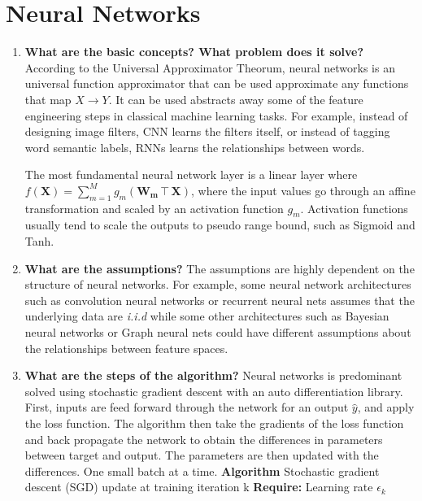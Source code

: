 \documentclass{article}
\begin{document}
\section{Neural Networks}
\noindent
\begin{enumerate}
    \item \textbf{What are the basic concepts? What problem does it solve?}
    \noindent 
    \smallbreak
    According to the Universal Approximator Theorum, neural networks is an universal function approximator that can be used approximate any functions that map $X \rightarrow Y$. It can be used abstracts away some of the feature engineering steps in classical machine learning tasks. For example, instead of designing image filters, CNN learns the filters itself, or instead of tagging word semantic labels, RNNs learns the relationships between words.
    
    The most fundamental neural network layer is a linear layer where $f(\mathbf{X}) = \sum_{m=1}^{M} g_m(\mathbf{W_m}\intercal\mathbf{X})$, where the input values go through an affine transformation and scaled by an activation function $g_m$. Activation functions usually tend to scale the outputs to pseudo range bound, such as Sigmoid and Tanh. 

    \item \textbf{What are the assumptions?}
    \noindent 
    \smallbreak
    The assumptions are highly dependent on the structure of neural networks. For example, some neural network architectures such as convolution neural networks or recurrent neural nets assumes that the underlying data are \emph{i.i.d} while some other architectures such as Bayesian neural networks or Graph neural nets could have different assumptions about the relationships between feature spaces.
    
    \item \textbf{What are the steps of the algorithm?}
    \noindent 
    \smallbreak
    Neural networks is predominant solved using stochastic gradient descent with an auto differentiation library. First, inputs are feed forward through the network for an output $\hat y$, and apply the loss function. The algorithm then take the gradients of the loss function and back propagate the network to obtain the differences in parameters between target and output. The parameters are then updated with the differences. One small batch at a time.
    \bigbreak
    \hline
    \noindent
    \textbf{Algorithm} Stochastic gradient descent (SGD) update at training iteration k \cite{2}
    \hline
    \smallbreak
    \textbf{Require:} Learning rate $\epsilon_k$
    

\end{enumerate}
\end{document}
